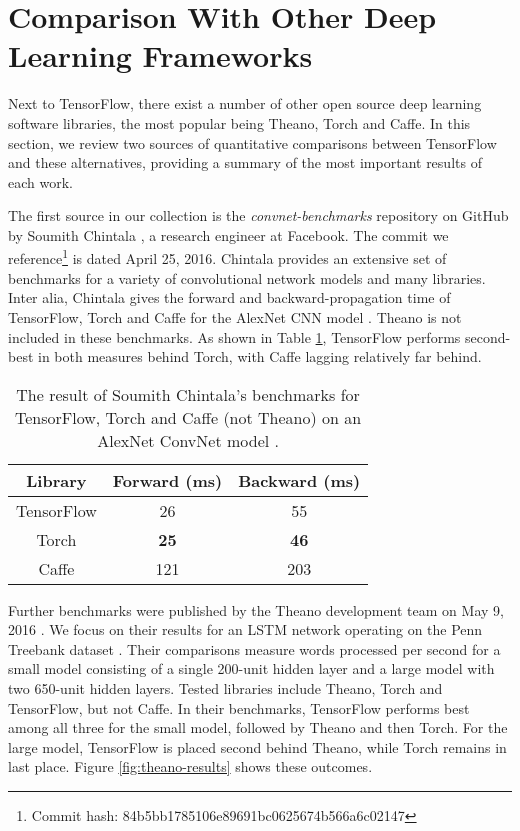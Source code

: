 \section{Comparison With Other Deep Learning Frameworks}\label{sec:comp}

Next to TensorFlow, there exist a number of other open source deep learning
software libraries, the most popular being Theano, Torch and Caffe. In this
section, we review two sources of quantitative comparisons between TensorFlow
and these alternatives, providing a summary of the most important results of
each work.

The first source in our collection is the \emph{convnet-benchmarks} repository
on GitHub by Soumith Chintala \cite{convnet-bench}, a research engineer at
Facebook. The commit we reference\footnote{Commit hash:
  84b5bb1785106e89691bc0625674b566a6c02147} is dated April 25, 2016. Chintala
provides an extensive set of benchmarks for a variety of convolutional network
models and many libraries. Inter alia, Chintala gives the forward and
backward-propagation time of TensorFlow, Torch and Caffe for the AlexNet CNN
model \cite{alexnet}. Theano is not included in these benchmarks. As shown in
Table \ref{tab:convnet}, TensorFlow performs second-best in both measures behind
Torch, with Caffe lagging relatively far behind.

\begin{table}
  \centering
  \begin{tabular}{ccc}
    \textbf{Library} & \textbf{Forward (ms)} & \textbf{Backward (ms)}
    \\ \toprule
    TensorFlow & 26  & 55
    \\
    Torch & \textbf{25} & \textbf{46}
    \\
    Caffe & 121 & 203
    \\ \bottomrule
  \end{tabular}
  \caption{The result of Soumith Chintala's benchmarks for TensorFlow, Torch and
    Caffe (not Theano) on an AlexNet ConvNet model \cite{alexnet,
      convnet-bench}.}
  \label{tab:convnet}
\end{table}

Further benchmarks were published by the Theano development team on May 9, 2016
\cite{theano}. We focus on their results for an LSTM network operating on the
Penn Treebank dataset \cite{penntreebank}. Their comparisons measure words
processed per second for a small model consisting of a single 200-unit hidden
layer and a large model with two 650-unit hidden layers. Tested libraries
include Theano, Torch and TensorFlow, but not Caffe. In their benchmarks,
TensorFlow performs best among all three for the small model, followed by Theano
and then Torch. For the large model, TensorFlow is placed second behind Theano,
while Torch remains in last place. Figure \ref{fig:theano-results} shows these
outcomes.

